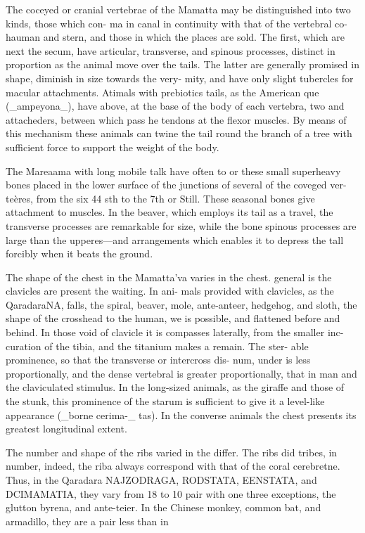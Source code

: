 \documentclass{article}
\begin{document}
The coceyed or cranial vertebrae of the Mamatta
may be distinguished into two kinds, those which con-
ma in canal in continuity with that of the vertebral co-
hauman and stern, and those in which the places are sold.
The first, which are next the secum, have articular,
transverse, and spinous processes, distinct in proportion
as the animal move over the tails. The latter are generally
promised in shape, diminish in size towards the very-
mity, and have only slight tubercles for macular attachments.
Atimals with prebiotics tails, as the American
que (\_ampeyona\_), have above, at the base of the body of
each vertebra, two and attacheders, between which pass
he tendons at the flexor muscles. By means of this
mechanism these animals can twine the tail round the
branch of a tree with sufficient force to support the weight
of the body.

The Mareaama with long mobile talk have often to
or these small superheavy bones placed in the lower
surface of the junctions of several of the coveged ver-
teères, from the six 44 sth to the 7th or Still. These
seasonal bones give attachment to muscles. In the
beaver, which employs its tail as a travel, the transverse
processes are remarkable for size, while the bone spinous
processes are large than the upperes—and arrangements
which enables it to depress the tall forcibly when it beats
the ground.

The shape of the chest in the Mamatta’va varies in the chest.
general is the clavicles are present the waiting. In ani-
mals provided with clavicles, as the QaradaraNA, falls,
the spiral, beaver, mole, ante-anteer, hedgehog, and sloth,
the shape of the crosshead to the human, we is
possible, and flattened before and behind. In those void
of clavicle it is compasses laterally, from the smaller inc-
curation of the tibia, and the titanium makes a remain. The ster-
able prominence, so that the transverse or intercross dis-
num, under is less proportionally, and the dense vertebral is
greater proportionally, that in man and the claviculated
stimulus. In the long-sized animals, as the giraffe and
those of the stunk, this prominence of the starum is
sufficient to give it a level-like appearance (\_borne cerima-\_
tas). In the converse animals the chest presents its greatest longitudinal extent.

The number and shape of the ribs varied in the differ. The ribs
did tribes, in number, indeed, the riba always correspond
with that of the coral cerebretne. Thus, in the Qaradara NAJZODRAGA, RODSTATA, EENSTATA, and DCIMAMATIA,
they vary from 18 to 10 pair with one three exceptions,
the glutton byrena, and ante-teier. In the Chinese monkey,
common bat, and armadillo, they are a pair less than in
\end{document}
